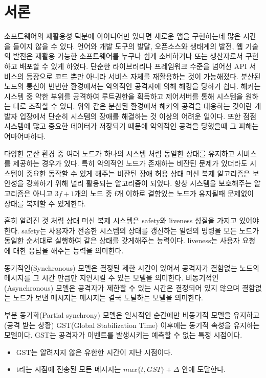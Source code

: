 \documentclass[table,smallextended]{svjour3}       %
\begin{document}
\section{서론}
\label{intro}
소프트웨어의 재활용성 덕분에 
아이디어만 있다면 새로운 앱을 구현하는데 많은 시간을 들이지 않을 수 있다.
언어와 개발 도구의 발달, 오픈소스와 생태계의 발전, 웹 기술의 발전은 
재활용 가능한 소프트웨어를 누구나 쉽게 소비하거나 또는 생산자로서 구현하고 배포할 수 있게 하였다.
단순한 라이브러리나 프레임워크 수준을 넘어선 API 서비스의 등장으로
코드 뿐만 아니라 서비스 자체를 재활용하는 것이 가능해졌다. 분산된 노드의
통신이 빈번한 환경에서는 악의적인 공격자에 의해 해킹을 당하기 쉽다.
해커는 시스템 중 약한 부위를 공격하여 루트권한을 획득하고 제어서버를 통해 
시스템을 원하는 대로 조작할 수 있다. 위와 같은 분산된 환경에서 해커의 공격을
대응하는 것이란 개발자 입장에서 단순히 시스템의 장애를 해결하는 것
이상의 어려운 일이다. 또한 점점 시스템에 많고 중요한 데이터가 저장되기 때문에 악의적인 공격을
당했을때 그 피해는 어마어마하다. 

다양한 분산 환경 중 여러 노드가 하나의 시스템 처럼
동일한 상태를 유지하고 서비스를 제공하는 경우가 있다.
특히 악의적인 노드가 존재하는 비잔틴 문제가 있더라도 시스템이
중요한 동작할 수 있게 해주는 비잔틴 장애 허용 상태 머신 복제 알고리즘은
보안성을 강화하기 위해 널리 활용되는 알고리즘이 되었다.
항상 시스템을 보호해주는 알고리즘은 아니고 \(3f+1\)개의 노드 중 f개 이하로 
결함있는 노드가 유지될때 문제없이 상태를 복제할 수 있게한다.

흔히 알려진 것 처럼 상태 머신 복제 시스템은 safety와 liveness 성질을 가지고 있어야 한다.
safety는 사용자가 전송한 시스템의 상태를 갱신하는 일련의
명령을 모든 노드가 동일한 순서대로 실행하여 같은 상태를 갖게해주는 능력이다.
liveness는 사용자 요청에 대한 응답을 해주는 능력을 의미한다.

동기적인(Synchronous)\cite{Synchron92}\cite{buchman2016tendermint} 모델은 결정된 제한 시간이 있어서 공격자가 결함없는 노드의 메시지를
그 시간 만큼만 지연시킬 수 있는 모델을 의미한다.
비동기적인(Asynchronous)\cite{Synchron92}\cite{buchman2016tendermint} 모델은 공격자가 제한할 수 있는 시간은 결정되어 있지 않으며
결함없는 노드가 보낸 메시지는 메시지는 결국 도달하는 모델을 의미한다.

부분 동기화(Partial synchrony)\cite{Synchron92}\cite{buchman2016tendermint} 모델은 일시적인 순간에만 비동기적 모델을 유지하고(공격 받는 상황) 
GST(Global Stabilization Time) 이후에는 동기적 속성을 유지하는 모델이다.
GST는 공격자가 이벤트를 발생시키는 예측할 수 없는 특정 시점이다.

\begin{itemize}
  \item GST는 알려지지 않은 유한한 시간이 지난 시점이다.
  \item t라는 시점에 전송된 모든 메시지는 \(max\{t,GST\}+\Delta\) 안에 도달한다.
\end{itemize}
\end{document}
